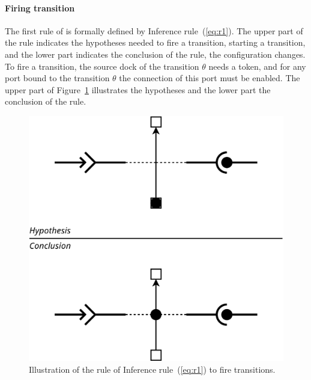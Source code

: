 \paragraph{Firing transition}{

The first rule of \mad is formally defined by
Inference rule~(\ref{eq:r1}). The upper part of the rule indicates the
hypotheses needed to fire a transition, \ie starting a transition,
and the lower part indicates the conclusion of the rule, \ie the configuration
changes. To fire a transition, the source dock of the transition
$\theta$ needs a token, and for any port bound to the transition
$\theta$ the connection of this port must be enabled.
The upper part of Figure~\ref{fig:r1} illustrates the
hypotheses and the lower part the conclusion of the rule.

\begin{figure}[t]
\begin{center}
  \includegraphics[width=0.55\columnwidth]{./images/firing.pdf}
\end{center}
\caption{Illustration of the rule of Inference rule~(\ref{eq:r1}) to fire transitions.}
\label{fig:r1}
\end{figure}

}

